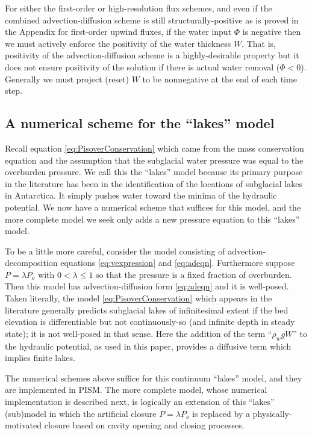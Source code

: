 \documentclass[11pt,final]{amsart}%
\begin{document}
For either the first-order or high-resolution flux schemes, and even if the combined advection-diffusion scheme is still structurally-positive as is proved in the Appendix for first-order upwind fluxes, if the water input $\Phi$ is negative then we must actively enforce the positivity of the water thickness $W$.  That is, positivity of the advection-diffusion scheme is a highly-desirable property but it does not ensure positivity of the solution if there is actual water removal ($\Phi < 0$).  Generally we must project (reset) $W$ to be nonnegative at the end of each time step.


\subsection*{A numerical scheme for the ``lakes'' model}  Recall equation \eqref{eq:PisoverConservation} which came from the mass conservation equation and the assumption that the subglacial water pressure was equal to the overburden pressure.  We call this the ``lakes'' model because its primary purpose in the literature has been in the identification of the locations of subglacial lakes in Antarctica.  It simply pushes water toward the minima of the hydraulic potential.  We now have a numerical scheme that suffices for this model, and the more complete model we seek only adds a new pressure equation to this ``lakes'' model.

To be a little more careful, consider the model consisting of advection-decomposition equations \eqref{eq:vexpression} and \eqref{eq:adeqn}.  Furthermore suppose $P=\lambda P_o$ with $0<\lambda\le 1$ so that the pressure is a fixed fraction of overburden.  Then this model has advection-diffusion form \eqref{eq:adeqn} and it is well-posed.  Taken literally, the model \eqref{eq:PisoverConservation} which appears in the literature generally predicts subglacial lakes of infinitesimal extent if the bed elevation is differentiable but not continuously-so (and infinite depth in steady state); it is not well-posed in that sense.  Here the addition of the term ``$\rho_w g W$'' to the hydraulic potential, as used in this paper, provides a diffusive term which implies finite lakes.

The numerical schemes above suffice for this continuum ``lakes'' model, and they are implemented in PISM.  The more complete model, whose numerical implementation is described next, is logically an extension of this ``lakes'' (sub)model in which the artificial closure $P=\lambda P_o$ is replaced by a physically-motivated closure based on cavity opening and closing processes.
\end{document}
